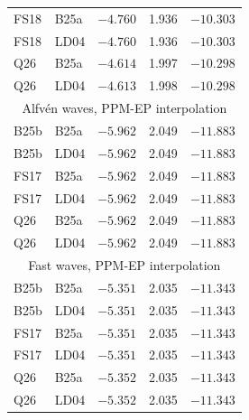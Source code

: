 \begin{table}
\begin{tabular}{llrrr}
FS18 & B25a & $-4.760$ & 1.936 & $-10.303$ \\
FS18 & LD04 & $-4.760$ & 1.936 & $-10.303$ \\
Q26 & B25a & $-4.614$ & 1.997 & $-10.298$ \\
Q26 & LD04 & $-4.613$ & 1.998 & $-10.298$ \\
\hline
\multicolumn{5}{c}{Alfv\'en waves, PPM-EP interpolation} \\
\hline
B25b & B25a & $-5.962$ & 2.049 & $-11.883$ \\
B25b & LD04 & $-5.962$ & 2.049 & $-11.883$ \\
FS17 & B25a & $-5.962$ & 2.049 & $-11.883$ \\
FS17 & LD04 & $-5.962$ & 2.049 & $-11.883$ \\
Q26 & B25a & $-5.962$ & 2.049 & $-11.883$ \\
Q26 & LD04 & $-5.962$ & 2.049 & $-11.883$ \\
\hline
\multicolumn{5}{c}{Fast waves, PPM-EP interpolation} \\
\hline
B25b & B25a & $-5.351$ & 2.035 & $-11.343$ \\
B25b & LD04 & $-5.351$ & 2.035 & $-11.343$ \\
FS17 & B25a & $-5.351$ & 2.035 & $-11.343$ \\
FS17 & LD04 & $-5.351$ & 2.035 & $-11.343$ \\
Q26 & B25a & $-5.352$ & 2.035 & $-11.343$ \\
Q26 & LD04 & $-5.352$ & 2.035 & $-11.343$ \\
\hline\hline
\end{tabular}
\end{table}